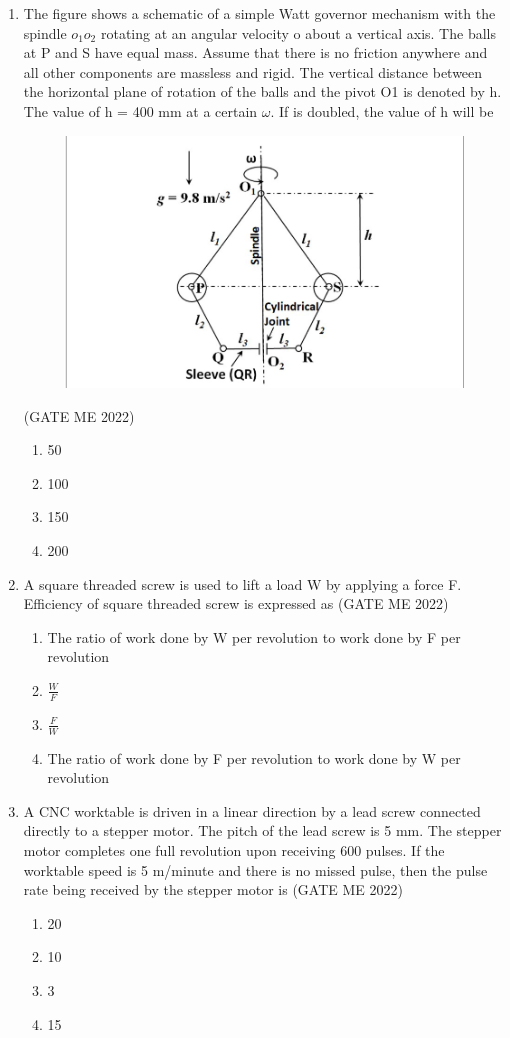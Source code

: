 \documentclass[journal]{IEEEtran}
\numberwithin{equation}{enumi}
\numberwithin{figure}{enumi}
\begin{document}
\begin{enumerate}
 \item The figure shows a schematic of a simple Watt governor mechanism with the
spindle $o_1 o_2$ rotating at an angular velocity o about a vertical axis. The balls at P and S have equal mass. Assume that there is no friction anywhere and all other components are massless and rigid. The vertical distance between the horizontal plane of rotation of the balls and the pivot O1 is denoted by h. The value of h = 400 mm at a certain $\omega$. If is doubled, the value of h will be
\begin{figure}[H]
    \centering
    \includegraphics[width = 0.5\columnwidth]{figs/fig4.7.png}
    \caption*{}
    \label{fig:Q17}
    \end{figure}
    \hfill{(GATE ME 2022)}
\begin{multicols}{4}
    \begin{enumerate}
        \item 50
        \item 100
        \item 150
        \item 200
    \end{enumerate}
\end{multicols}
\item A square threaded screw is used to lift a load W by applying a force F. Efficiency of square threaded screw is expressed as
\hfill{(GATE ME 2022)}
\begin{enumerate}
    \item The ratio of work done by W per revolution to work done by F per revolution
    \item $\frac{W}{F}$
    \item $\frac{F}{W}$
    \item The ratio of work done by F per revolution to work done by W per revolution
\end{enumerate}
 
\item 
A CNC worktable is driven in a linear direction by a lead screw connected directly to a stepper motor. The pitch of the lead screw is 5 mm. The stepper motor completes one full revolution upon receiving 600 pulses. If the worktable speed is 5 m/minute and there is no missed pulse, then the pulse rate being received by the stepper motor is
\hfill{(GATE ME 2022)}
 \begin{multicols}{4}
     \begin{enumerate}
         \item 20
         \item 10
         \item 3
         \item 15
     \end{enumerate}
 \end{multicols}


\end{enumerate}
\end{document}
